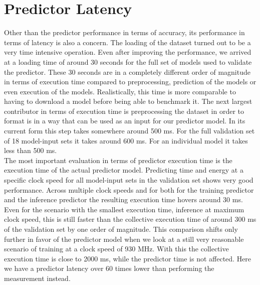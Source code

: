 \FloatBarrier



\section{Predictor Latency}

Other than the predictor performance in terms of accuracy, its performance in terms of latency is also a concern. The loading of the dataset turned out to be a very time intensive operation. Even after improving the performance, we arrived at a loading time of around 30 seconds for the full set of models used to validate the predictor. These 30 seconds are in a completely different order of magnitude in terms of execution time compared to preprocessing, prediction of the models or even execution of the models. Realistically, this time is more comparable to having to download a model before being able to benchmark it. The next largest contributor in terms of execution time is preprocessing the dataset in order to format is in a way that can be used as an input for our predictor model. In its current form this step takes somewhere around 500 ms. For the full validation set of 18 model-input sets it takes around 600 ms. For an individual model it takes less than 500 ms. \\
The most important evaluation in terms of predictor execution time is the execution time of the actual predictor model. Predicting time and energy at a specific clock speed for all model-input sets in the validation set shows very good performance. Across multiple clock speeds and for both for the training predictor and the inference predictor the resulting execution time hovers around 30 ms. Even for the scenario with the smallest execution time, inference at maximum clock speed, this is still faster than the collective execution time of around 300 ms of the validation set by one order of magnitude. This comparison shifts only further in favor of the predictor model when we look at a still very reasonable scenario of training at a clock speed of 930 MHz. With this the collective execution time is close to 2000 ms, while the predictor time is not affected. Here we have a predictor latency over 60 times lower than performing the measurement instead.